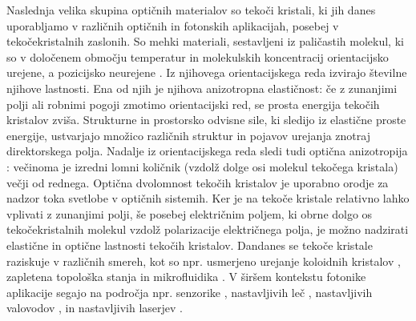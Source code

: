 \documentclass[a4paper,11pt]{article}
\begin{document}
Naslednja velika skupina optičnih materialov so tekoči kristali, ki jih danes uporabljamo v različnih optičnih in fotonskih aplikacijah, posebej v tekočekristalnih zaslonih. 
So mehki materiali, sestavljeni iz paličastih molekul, ki so v določenem območju temperatur in molekulskih koncentracij orientacijsko urejene, a pozicijsko neurejene \cite{degennes}.
Iz njihovega orientacijskega reda izvirajo številne njihove lastnosti. 
Ena od njih je njihova anizotropna elastičnost: če z zunanjimi polji ali robnimi pogoji zmotimo orientacijski red, se prosta energija tekočih kristalov zviša. 
Strukturne in prostorsko odvisne sile, ki sledijo iz elastične proste energije, ustvarjajo množico različnih struktur in pojavov urejanja znotraj direktorskega polja.
Nadalje iz orientacijskega reda sledi tudi optična anizotropija \cite{hecht-optics}: večinoma je izredni lomni količnik (vzdolž dolge osi molekul tekočega kristala) večji od rednega. 
Optična dvolomnost tekočih kristalov je uporabno orodje za nadzor toka svetlobe v optičnih sistemih. 
Ker je na tekoče kristale relativno lahko vplivati z zunanjimi polji, še posebej električnim poljem, ki obrne dolgo os tekočekristalnih molekul vzdolž polarizacije električnega polja, je možno nadzirati elastične in optične lastnosti tekočih kristalov. 
Dandanes se tekoče kristale raziskuje v različnih smereh, kot so npr. usmerjeno urejanje koloidnih kristalov \cite{zumer-2006-assembly,musevic-2013-assembly}, zapletena topološka stanja \cite{musevic-2011-knots,smalyukh-2014-knots,zumer-2014-knots} in mikrofluidika \cite{yeomans-2013-lc-microfluidics}.
V širšem kontekstu fotonike aplikacije segajo na področja npr. senzorike \cite{abbott-2013-sensing}, nastavljivih leč \cite{neyts-2017-lensing,lin-2011-lensing}, nastavljivih valovodov \cite{kitzerow-2014-fibres}, in nastavljivih laserjev \cite{humar-2016-lasing}.


\end{document}
